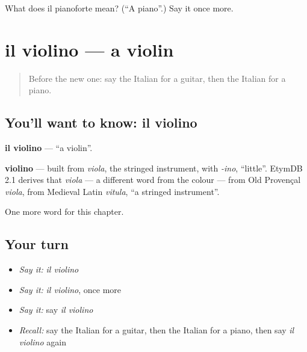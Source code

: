 \begin{tcolorbox}[breakable,colback=teal!4,colframe=teal!35!black,title={Before you move on}]
What does il pianoforte mean? (\textquotedblleft{}A piano\textquotedblright{}.) Say it once more.
\end{tcolorbox}
\section[il violino]{il violino — a violin}

\label{lesson:IT-C170-violino}



\begin{quote}
Before the new one: say the Italian for a guitar, then the Italian for a piano.
\end{quote}

\subsection*{You'll want to know: il violino}
\textbf{il violino} — \textquotedblleft{}a violin\textquotedblright{}.

\begin{cousinweb}
\textbf{violino} — built from \emph{viola}, the stringed instrument, with \emph{-ino}, \textquotedblleft{}little\textquotedblright{}. EtymDB 2.1 derives that \emph{viola} — a different word from the colour — from Old Provençal \emph{viola}, from Medieval Latin \emph{vitula}, \textquotedblleft{}a stringed instrument\textquotedblright{}.
\end{cousinweb}

\begin{grammarlens}[title={What you've built}]
One more word for this chapter.
\end{grammarlens}

\subsection*{Your turn}
\begin{itemize}
\raggedright
  \item \emph{Say it:} \emph{il violino}
  \item \emph{Say it:} \emph{il violino}, once more
  \item \emph{Say it:} say \emph{il violino}
  \item \emph{Recall:} say the Italian for a guitar, then the Italian for a piano, then say \emph{il violino} again
\end{itemize}

